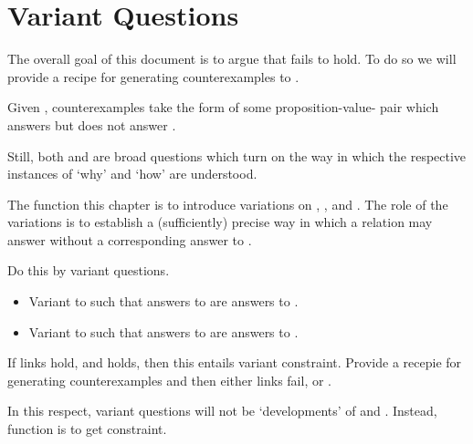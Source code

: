 \chapter{Variant Questions}
\label{cha:var}

\begin{note}
  The overall goal of this document is to argue that \issueInclusion{} fails to hold.
  To do so we will provide a recipe for generating counterexamples to \issueInclusion{}.

  Given \issueInclusion{}, counterexamples take the form of some proposition-value-\pool{} pair which answers \qWhy{} but does not answer \qHow{}.


  Still, both \qWhy{} and \qHow{} are broad questions which turn on the way in which the respective instances of `why' and `how' are understood.

  The function this chapter is to introduce variations on \qWhy{}, \qHow{}, and \issueInclusion{}.
  The role of the variations is to establish a (sufficiently) precise way in which a relation may answer \qWhy{} without a corresponding answer to \qHow{}.
\end{note}

\begin{note}
  Do this by variant questions.

  \begin{itemize}
  \item
    Variant to \qWhy{} such that answers to \qWhyV{} are answers to \qWhy{}.
  \item
    Variant to \qHow{} such that answers to \qHow{} are answers to \qHowV{}.
  \end{itemize}

  If links hold, and \issueConstraint{} holds, then this entails variant constraint.
  Provide a recepie for generating counterexamples and then either links fail, or \issueConstraint{}.

  In this respect, variant questions will not be `developments' of \qWhy{} and \qHow{}.
  Instead, function is to get constraint.
\end{note}

